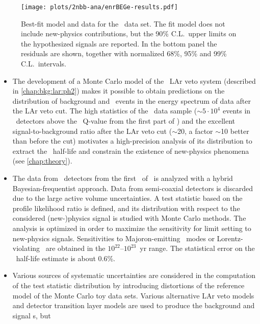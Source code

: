 \begin{figure}
  \centering
  \texttt{[image: plots/2nbb-ana/enrBEGe-results.pdf]}
  \caption{%
    Best-fit model and data for the \enrBEGeII\ data set. The fit model does not include
    new-physics contributions, but the 90\% C.L.~upper limits on the
    hypothesized signals are reported. In the bottom panel the residuals are shown,
    together with normalized 68\%, 95\% and 99\% C.L.~intervals.
  }\label{fig:2nbb-ana:limits}
\end{figure}

\chapendgliph{}

\chapsummary
\begin{itemize}
  \item The development of a Monte Carlo model of the \gerda\ LAr veto system (described
    in \cref{chap:bkg:lar:ph2}) makes it possible to obtain predictions on the
    distribution of background and \nnbb\ events in the energy spectrum of data after the
    LAr veto cut. The high statistics of the \nnbb\ data sample ($\sim$$5 \cdot 10^4$
    events in \bege\ detectors above the \Arl\ Q-value from the first part of \phasetwo)
    and the excellent signal-to-background ratio after the LAr veto cut ($\sim$20, a
    factor $\sim$10 better than before the cut) motivates a high-precision analysis of its
    distribution to extract the \nnbb\ half-life and constrain the existence of
    new-physics phenomena (see \cref{chap:theory}).
  \item The data from \bege\ detectors from the first \gexpophasetwobkg\ of \phasetwo\
    is analyzed with a hybrid Bayesian-frequentist approach. Data from semi-coaxial
    detectors is discarded due to the large active volume uncertainties. A test statistic
    based on the profile likelihood ratio is defined, and its distribution with respect to
    the considered (new-)physics signal is studied with Monte Carlo methods. The analysis
    is optimized in order to maximize the sensitivity for limit setting to new-physics
    signals. Sensitivities to Majoron-emitting \onbb\ modes or Lorentz-violating \nnbb\
    are obtained in the $10^{22}$--$10^{23}$~yr range. The statistical error on the \nnbb\
    half-life estimate is about 0.6\%.
  \item Various sources of systematic uncertainties are considered in the computation of
    the test statistic distribution by introducing distortions of the reference model of
    the Monte Carlo toy data sets. Various alternative LAr veto models and detector
    transition layer models are used to produce the background and signal \pdf{}s, but
$$
\end{itemize}

